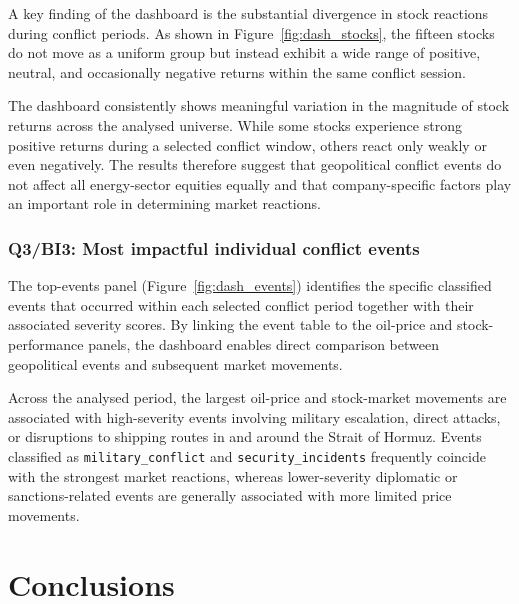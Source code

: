 \documentclass[11pt,a4paper]{article}
\begin{document}
A key finding of the dashboard is the substantial divergence in stock
reactions during conflict periods. As shown in
Figure~\ref{fig:dash_stocks}, the fifteen stocks do not move as a
uniform group but instead exhibit a wide range of positive, neutral,
and occasionally negative returns within the same conflict session.

The dashboard consistently shows meaningful variation in the
magnitude of stock returns across the analysed universe. While some
stocks experience strong positive returns during a selected conflict
window, others react only weakly or even negatively. The results
therefore suggest that geopolitical conflict events do not affect all
energy-sector equities equally and that company-specific factors play
an important role in determining market reactions.

\subsubsection{Q3/BI3: Most impactful individual conflict events}
\label{sec:answer_q3}

The top-events panel (Figure~\ref{fig:dash_events}) identifies the
specific classified events that occurred within each selected conflict
period together with their associated severity scores. By linking the
event table to the oil-price and stock-performance panels, the
dashboard enables direct comparison between geopolitical events and
subsequent market movements.

Across the analysed period, the largest oil-price and stock-market
movements are associated with high-severity events involving military
escalation, direct attacks, or disruptions to shipping routes in and
around the Strait of Hormuz. Events classified as
\texttt{military\_conflict} and \texttt{security\_incidents}
frequently coincide with the strongest market reactions, whereas
lower-severity diplomatic or sanctions-related events are generally
associated with more limited price movements.


\newpage

\section{Conclusions}
\label{sec:conclusions}
\end{document}
